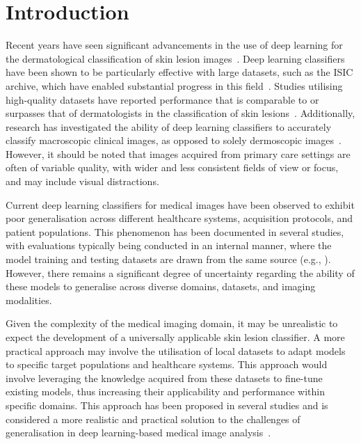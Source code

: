 
\section{Introduction}
\label{sec:generalisation_intro}
Recent years have seen significant advancements in the use of deep learning for the dermatological classification of skin lesion images~\citep{du2020ai,wu2022skin}. Deep learning classifiers have been shown to be particularly effective with large datasets, such as the ISIC archive, which have enabled substantial progress in this field~\citep{tschandl2018ham10000,wen2021characteristics}. Studies utilising high-quality datasets have reported performance that is comparable to or surpasses that of dermatologists in the classification of skin lesions~\citep{esteva2017dermatologist,haenssle2018man,han2018classification,tschandl2019expert}. Additionally, research has investigated the ability of deep learning classifiers to accurately classify macroscopic clinical images, as opposed to solely dermoscopic images~\citep{fujisawa2019deep}. However, it should be noted that images acquired from primary care settings are often of variable quality, with wider and less consistent fields of view or focus, and may include visual distractions.

Current deep learning classifiers for medical images have been observed to exhibit poor generalisation across different healthcare systems, acquisition protocols, and patient populations. This phenomenon has been documented in several studies, with evaluations typically being conducted in an internal manner, where the model training and testing datasets are drawn from the same source (e.g., \cite{han2018classification}). However, there remains a significant degree of uncertainty regarding the ability of these models to generalise across diverse domains, datasets, and imaging modalities. 

Given the complexity of the medical imaging domain, it may be unrealistic to expect the development of a universally applicable skin lesion classifier. A more practical approach may involve the utilisation of local datasets to adapt models to specific target populations and healthcare systems. This approach would involve leveraging the knowledge acquired from these datasets to fine-tune existing models, thus increasing their applicability and performance within specific domains. This approach has been proposed in several studies and is considered a more realistic and practical solution to the challenges of generalisation in deep learning-based medical image analysis~\citep{glocker2022risk}. 

